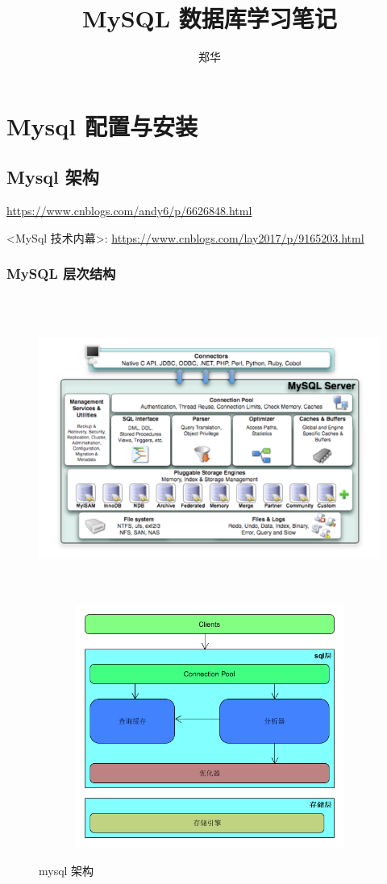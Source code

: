 \documentclass[UTF8,a4paper,12pt]{ctexbook}
\author{\kaishu 郑华}
\title{\heiti MySQL 数据库学习笔记}
\begin{document}
 	\maketitle
\chapter{Mysql 配置与安装}
	\section{Mysql 架构}
		\url{https://www.cnblogs.com/andy6/p/6626848.html}
		
		<MySql 技术内幕>: \url{https://www.cnblogs.com/lay2017/p/9165203.html}
		
		\subsection{MySQL 层次结构}
			\begin{figure}[H]
				\centering
				\includegraphics[width=17cm,height= 10cm]{arch}
				\includegraphics[width=16cm,height= 8cm]{arch2}			
				\caption{mysql 架构}
			\end{figure} 
			
\end{document}
